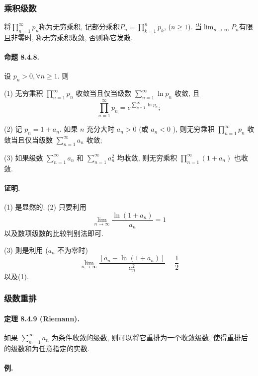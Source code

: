 \subsubsection{乘积级数}

将$\prod_{n=1}^{\infty}p_{n}$称为无穷乘积, 记部分乘积$P_{n}=\prod_{k=1}^{n}p_{k}$,
($n\ge1$). 当$\lim_{n\to\infty}P_{n}$有限且非零时, 称无穷乘积收敛, 否则称它发散.

\paragraph{命题 8.4.8.}

设 $p_{n}>0,\forall n\geqslant1$. 则 

(1) 无穷乘积 $\prod_{n=1}^{\infty}p_{n}$ 收敛当且仅当级数 $\sum_{n=1}^{\infty}\ln p_{n}$
收敛, 且 
\[
\prod_{n=1}^{\infty}p_{n}=e^{\sum_{n=1}^{\infty}\ln p_{n}};
\]

(2) 记 $p_{n}=1+a_{n}$. 如果 $n$ 充分大时 $a_{n}>0$ (或 $a_{n}<0$ ), 则无穷乘积
$\prod_{n=1}^{\infty}p_{n}$ 收敛当且仅当级数 $\sum_{n=1}^{\infty}a_{n}$
收敛; 

(3) 如果级数 $\sum_{n=1}^{\infty}a_{n}$ 和 $\sum_{n=1}^{\infty}a_{n}^{2}$
均收敛, 则无穷乘积 $\prod_{n=1}^{\infty}\left(1+a_{n}\right)$ 也收敛. 

\paragraph{证明. }

(1) 是显然的. (2) 只要利用 
\[
\lim_{n\rightarrow\infty}\frac{\ln\left(1+a_{n}\right)}{a_{n}}=1
\]
以及数项级数的比较判别法即可. 

(3) 则是利用 ($a_{n}$ 不为零时) 
\[
\lim_{n\rightarrow\infty}\frac{\left[a_{n}-\ln\left(1+a_{n}\right)\right]}{a_{n}^{2}}=\frac{1}{2}
\]
以及(1).

\subsubsection{级数重排}

\paragraph{定理 8.4.9 (Riemann). }

如果 $\sum_{n=1}^{\infty}a_{n}$ 为条件收敛的级数, 则可以将它重排为一个收敛级数, 使得重排后的级数和为任意指定的实数.

\paragraph{例.}

